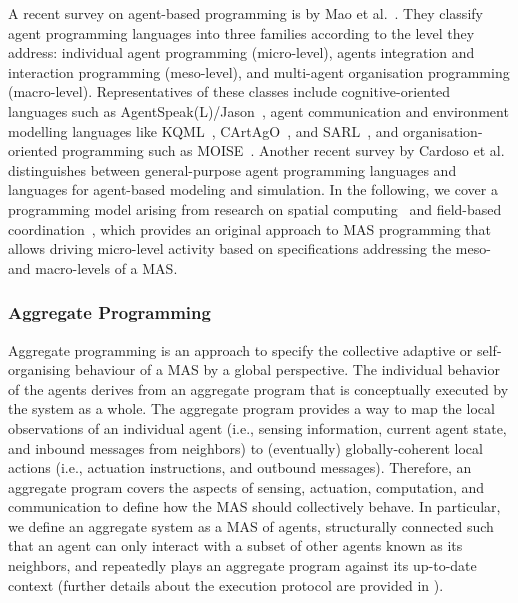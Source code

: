 \documentclass[jsan,article,accept,moreauthors,pdftex]{Definitions/mdpi}
\begin{document}
A recent survey on agent-based programming 
 is by Mao et al.~\cite{DBLP:journals/wias/MaoWY17}.
%
They classify agent programming languages 
 into three families according to the level they address:
 individual agent programming ({micro-level}),
 agents integration and interaction programming ({meso-level}),
 and 
 multi-agent organisation programming ({macro-level}).
%
Representatives 
 of these classes
 include cognitive-oriented languages
 such as AgentSpeak(L)/Jason~\cite{bordini2007programming-mas-agentspeak},
 agent communication and environment modelling languages
 like KQML~\cite{DBLP:conf/cikm/FininFMM94}, CArtAgO~\cite{DBLP:books/sp/09/RicciPVO09}, and SARL~\cite{DBLP:conf/webi/RodriguezGG14},
 and organisation-oriented programming such as MOISE~\cite{DBLP:journals/ijaose/HubnerSB07}.
%
Another recent survey by Cardoso et al.~\cite{computers10020016}
 distinguishes between general-purpose agent programming languages
  and languages for agent-based modeling and simulation.
%
In the following, we cover a programming model
 arising from research on {spatial computing}~\cite{dagstuhl2006seminar-space-oriented-computation,DBLP:journals/corr/abs-1202-5509}
 and {field-based coordination}~\cite{DBLP:books/daglib/0015276,viroli2019jlamp-si-coord},
 which provides an original approach
 to MAS programming
 that allows driving micro-level activity
 based on specifications
 addressing the meso- and macro-levels of a MAS.

\subsubsection{Aggregate Programming}
\label{background-ac}

Aggregate programming is an approach 
 to specify the {collective adaptive}
 or {self-organising} behaviour
 of a MAS by a global perspective.
%
The individual behavior of the agents
 derives from an {aggregate program}
 that is conceptually executed by the system as a whole.
%
The aggregate program 
 provides a way to map 
 the local observations of an individual agent
 (i.e., sensing information, current agent state, and inbound messages from neighbors)
 to (eventually) globally-coherent local actions
 (i.e., actuation instructions, and outbound messages).
%
Therefore, an aggregate program 
 covers the aspects of 
 sensing, actuation, computation, and communication
 to define how the MAS should collectively behave.
%
In particular, we define an {aggregate system}
 as a MAS of agents,
 structurally connected such that an agent can only interact with a subset of other agents known as its {neighbors},
 and repeatedly plays an aggregate program against its up-to-date context
 (further details about the execution protocol are provided in ).
\end{document}
